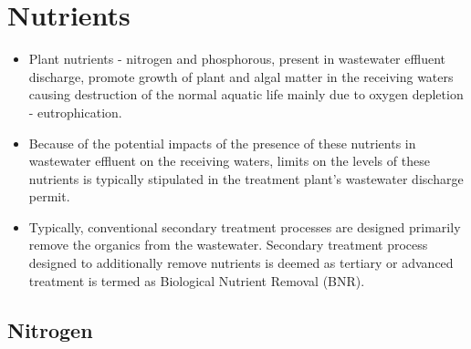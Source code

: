 \chapter{Nutrients}		
			\begin{itemize}
				\item Plant nutrients - nitrogen and phosphorous, present in wastewater effluent discharge, promote growth of plant and algal matter in the receiving waters causing destruction of the normal aquatic life mainly due to oxygen depletion - eutrophication.
				      
				\item Because of the potential impacts of the presence of these nutrients in wastewater effluent on the receiving waters,  limits on the levels of these nutrients is typically stipulated in the treatment plant's wastewater discharge permit.
				      
				\item Typically, conventional secondary treatment processes are designed primarily remove the organics from the wastewater.  Secondary treatment process designed to additionally remove nutrients is deemed as tertiary or advanced treatment is termed as Biological Nutrient Removal (BNR).
			\end{itemize}
	\section{Nitrogen}				

